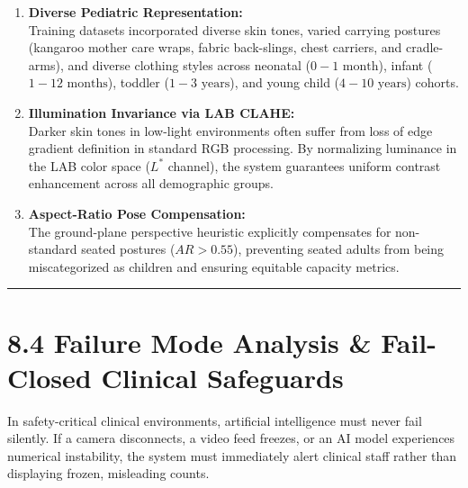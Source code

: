 \begin{enumerate}
\def\labelenumi{\arabic{enumi}.}
\tightlist
\item
  \textbf{Diverse Pediatric Representation:}\\
  Training datasets incorporated diverse skin tones, varied carrying
  postures (kangaroo mother care wraps, fabric back-slings, chest
  carriers, and cradle-arms), and diverse clothing styles across
  neonatal (\(0-1\text{ month}\)), infant (\(1-12\text{ months}\)),
  toddler (\(1-3\text{ years}\)), and young child
  (\(4-10\text{ years}\)) cohorts.
\item
  \textbf{Illumination Invariance via LAB CLAHE:}\\
  Darker skin tones in low-light environments often suffer from loss of
  edge gradient definition in standard RGB processing. By normalizing
  luminance in the LAB color space (\(L^*\) channel), the system
  guarantees uniform contrast enhancement across all demographic groups.
\item
  \textbf{Aspect-Ratio Pose Compensation:}\\
  The ground-plane perspective heuristic explicitly compensates for
  non-standard seated postures (\(AR > 0.55\)), preventing seated adults
  from being miscategorized as children and ensuring equitable capacity
  metrics.
\end{enumerate}

\begin{center}\rule{0.5\linewidth}{0.5pt}\end{center}

\section{8.4 Failure Mode Analysis \& Fail-Closed Clinical
Safeguards}\label{failure-mode-analysis-fail-closed-clinical-safeguards}

In safety-critical clinical environments, artificial intelligence must
never fail silently. If a camera disconnects, a video feed freezes, or
an AI model experiences numerical instability, the system must
immediately alert clinical staff rather than displaying frozen,
misleading counts.

